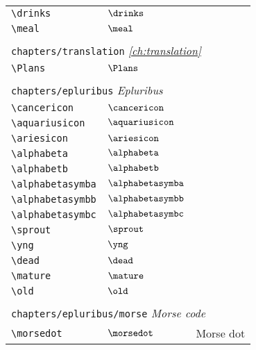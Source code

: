\begin{longtable}{lll}
 {\color[rgb]{0.5,0.5,0.5}\texttt{\textbackslash drinks}} & $\drinks$ & \\ 
 {\color[rgb]{0.5,0.5,0.5}\texttt{\textbackslash meal}} & $\meal$ & \\ 
  &  & \\ 
 \multicolumn{3}{l}{{\color[rgb]{0.5,0.5,0.5}\texttt{chapters/translation}} \emph{\cref{ch:translation}}}\\ 
 \hline
{\color[rgb]{0.5,0.5,0.5}\texttt{\textbackslash Plans}} & $\Plans$ & \\ 
  &  & \\ 
 \multicolumn{3}{l}{{\color[rgb]{0.5,0.5,0.5}\texttt{chapters/epluribus}} \emph{Epluribus}}\\ 
 \hline
{\color[rgb]{0.5,0.5,0.5}\texttt{\textbackslash cancericon}} & $\cancericon$ & \\ 
 {\color[rgb]{0.5,0.5,0.5}\texttt{\textbackslash aquariusicon}} & $\aquariusicon$ & \\ 
 {\color[rgb]{0.5,0.5,0.5}\texttt{\textbackslash ariesicon}} & $\ariesicon$ & \\ 
 {\color[rgb]{0.5,0.5,0.5}\texttt{\textbackslash alphabeta}} & $\alphabeta$ & \\ 
 {\color[rgb]{0.5,0.5,0.5}\texttt{\textbackslash alphabetb}} & $\alphabetb$ & \\ 
 {\color[rgb]{0.5,0.5,0.5}\texttt{\textbackslash alphabetasymba}} & $\alphabetasymba$ & \\ 
 {\color[rgb]{0.5,0.5,0.5}\texttt{\textbackslash alphabetasymbb}} & $\alphabetasymbb$ & \\ 
 {\color[rgb]{0.5,0.5,0.5}\texttt{\textbackslash alphabetasymbc}} & $\alphabetasymbc$ & \\ 
 {\color[rgb]{0.5,0.5,0.5}\texttt{\textbackslash sprout}} & $\sprout$ & \\ 
 {\color[rgb]{0.5,0.5,0.5}\texttt{\textbackslash yng}} & $\yng$ & \\ 
 {\color[rgb]{0.5,0.5,0.5}\texttt{\textbackslash dead}} & $\dead$ & \\ 
 {\color[rgb]{0.5,0.5,0.5}\texttt{\textbackslash mature}} & $\mature$ & \\ 
 {\color[rgb]{0.5,0.5,0.5}\texttt{\textbackslash old}} & $\old$ & \\ 
  &  & \\ 
 \multicolumn{3}{l}{{\color[rgb]{0.5,0.5,0.5}\texttt{chapters/epluribus/morse}} \emph{Morse code}}\\ 
 \hline
{\color[rgb]{0.5,0.5,0.5}\texttt{\textbackslash morsedot}} & $\morsedot$ &  Morse dot\\ 

\end{longtable}
